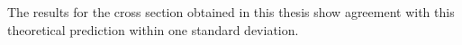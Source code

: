 The results for the cross section obtained in this thesis show agreement with this theoretical prediction within one standard deviation.
%
%
%
%
%

